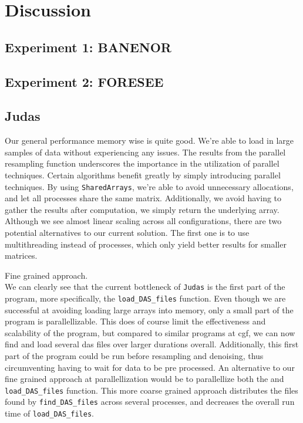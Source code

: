 \section{Discussion}
\label{chap:discussion}

\subsection{Experiment 1: BANENOR}
\subsection{Experiment 2: FORESEE}

\subsection{Judas}

Our general performance memory wise is quite good. We're able to load in large samples of data without experiencing any issues.
The results from the parallel resampling function underscores the importance in the utilization of parallel techniques. Certain algorithms benefit greatly by simply introducing parallel techniques. By using \texttt{SharedArrays}, we're able to avoid unnecessary allocations, and let all processes share the same matrix. Additionally, we avoid having to gather the results after computation, we simply return the underlying array. Although we see almost linear scaling across all configurations, there are two potential alternatives to our current solution. The first one is to use multithreading instead of processes, which only yield better results for smaller matrices.

Fine grained approach. \\

We can clearly see that the current bottleneck of \texttt{Judas} is the first part of the program, more specifically, the \texttt{load\_DAS\_files} function. Even though we are successful at avoiding loading large arrays into memory, only a small part of the program is parallellizable. This does of course limit the effectiveness and scalability of the program, but compared to similar programs at \acrshort{cgf}, we can now find and load several \acrshort{das} files over larger durations overall. Additionally, this first part of the program could be run before resampling and denoising, thus circumventing having to wait for data to be pre processed. An alternative to our fine grained approach at parallellization would be to parallellize both the and \texttt{load\_DAS\_files} function. This more coarse grained approach distributes the files found by \texttt{find\_DAS\_files} across several processes, and decreases the overall run time of \texttt{load\_DAS\_files}. \\

